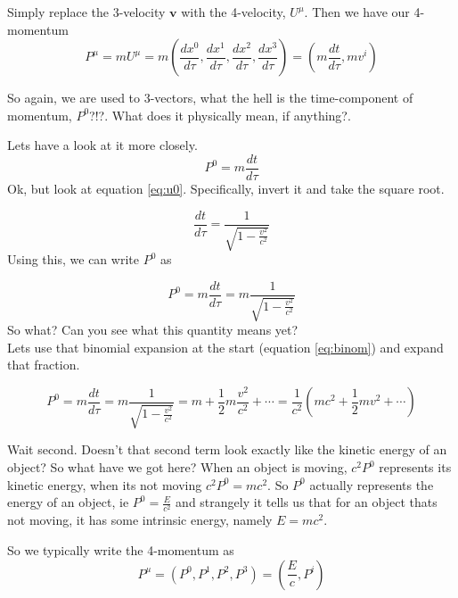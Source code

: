 Simply replace the 3-velocity $\mathbf{v}$ with the 4-velocity, $U^\mu$. Then we have our 4-momentum
\begin{equation}
  P^\mu = m U^\mu = m (\frac{dx^0}{d\tau}, \frac{dx^1}{d\tau},\frac{dx^2}{d\tau},\frac{dx^3}{d\tau}) = (m \frac{dt}{d\tau},m v^i)
\end{equation}

So again, we are used to 3-vectors, what the hell is the time-component of momentum, $P^0$?!?. What does it physically mean, if anything?. 

Lets have a look at it more closely.
\begin{equation}
  P^0 = m \frac{dt}{d\tau}
\end{equation}
Ok, but look at equation \eqref{eq:u0}. Specifically, invert it and take the square root. 

\begin{equation}
  \frac{dt}{d\tau} = \frac{1}{\sqrt{1  - \frac{v^2}{c^2}}}
\end{equation}
Using this, we can write $P^0$ as

\begin{equation}
  P^0 = m \frac{dt}{d\tau} = m \frac{1}{\sqrt{1 - \frac{v^2}{c^2}}} 
\end{equation}
So what? Can you see what this quantity means yet? \\
Lets use that binomial expansion at the start (equation \eqref{eq:binom}) and expand that fraction. 

\begin{equation}
  P^0 = m \frac{dt}{d\tau} = m \frac{1}{\sqrt{1 - \frac{v^2}{c^2}}} = m + \frac{1}{2} m \frac{v^2}{c^2} + \cdots = \frac{1}{c^2} (m c^2 + \frac{1}{2}m v^2 + \cdots)
\end{equation}

Wait second. Doesn't that second term look exactly like the kinetic energy of an object? So what have we got here? When an object is moving, $c^2 P^0$ represents its kinetic energy, when its not moving $c^2 P^0 = m c^2$. So $P^0$ actually represents the energy of an object, ie $P^0 = \frac{E}{c^2}$ and strangely it tells us that for an object thats not moving, it has some intrinsic energy, namely $E = m c^2$. 

So we typically write the 4-momentum as
\begin{equation}
  P^\mu = (P^0, P^1, P^2, P^3) = (\frac{E}{c}, P^i)
  \label{eq:4P}
\end{equation}


